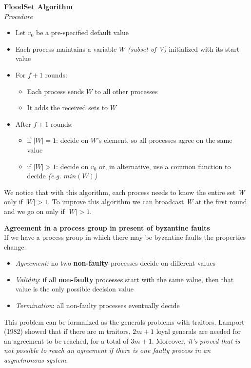 \textbf{FloodSet Algorithm}\\
\textit{Procedure}\\
\begin{itemize}
    \item Let $v_0$ be a pre-specified default value
    \item Each process maintains a variable $W$ \textit{(subset of V)} initialized with its start value
    \item For $f+1$ rounds:
    \begin{itemize}
        \item Each process sends $W$ to all other processes
        \item It adds the received sets to $W$
    \end{itemize}
    \item After $f+1$ rounds:
    \begin{itemize}
        \item if $|W| = 1$: decide on $W$'s element, so all processes agree on the same value
        \item if $|W| > 1$: decide on $v_0$ or, in alternative, use a common function to decide \textit{(e.g. $min(W)$)}
    \end{itemize}
\end{itemize}

We notice that with this algorithm, each process needs to know the
entire set \emph{W} only if $|W| > 1$. To improve this algorithm we can broadcast \emph{W} at the first round and we go on only if $|W| > 1$.

\textbf{Agreement in a process group in present of byzantine faults}\\
If we have a process group in which there may be byzantine faults the properties change:

\begin{itemize}
\itemsep1pt\parskip0pt
\item
  \emph{Agreement:} no two \textbf{non-faulty} processes decide on
  different values
\item
  \emph{Validity}: if all \textbf{non-faulty} processes start with the
  same value, then that value is the only possible decision value
\item
  \emph{Termination}: all non-faulty processes eventually decide
\end{itemize}

This problem can be formalized as the generals problems with traitors.
Lamport (1982) showed that if there are m traitors, $2m+1$ loyal
generals are needed for an agreement to be reached, for a total of
$3m+1$. Moreover, \textit{it's proved that is not possible to reach an agreement if there is one faulty process in an asynchronous system}.

